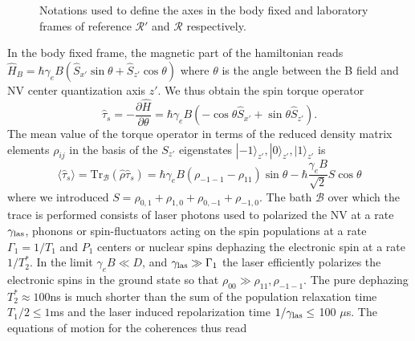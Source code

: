 \documentclass[preprintnumbers,amsmath,amssymb,onecolumn,12pt]{revtex4}
\newcommand{\be}{\begin{equation}}
\newcommand{\ee}{\end{equation}}
\begin{document}
\begin{figure}[ht]
  \caption{Notations used to define the axes in the body fixed and laboratory frames of reference $\mathcal{R'}$ and $\mathcal{R}$ respectively.}
  		\label{axes}
\end{figure}

In the body fixed frame, the magnetic part of the hamiltonian reads 
$\hat {H}_{B}= \hbar \gamma_e B  (\hat{S}_{x'} \sin\theta + \hat{S}_{z'} \cos\theta)$
where $\theta$ is the angle between the B field and NV center quantization axis $z'$.
We thus obtain the spin torque operator
\be
\hat \tau_s = -\frac{\partial \hat{H}}{\partial \theta} = \hbar \gamma_e B (-\cos\theta \hat{S}_{x'}+\sin\theta \hat{S}_{z'}).
\ee
The mean value of the torque operator in terms of the reduced density matrix elements $\rho_{ij}$ in the basis of the $S_{z'}$ eigenstates $|-1\rangle_{z'},|0\rangle_{z'},|1\rangle_{z'}$ is 
\be
\langle \hat \tau_s \rangle =\mathrm{Tr}_\mathcal{B}(\hat \rho \hat \tau_s) = \hbar \gamma_e B   (\rho_{-1-1}-\rho_{11})\sin\theta - \hbar \frac{\gamma_e B}{\sqrt{2}} S \cos\theta\label{torquemean}
\ee
where we introduced $S=\rho_{0,1}+\rho_{1,0}+\rho_{0,-1}+\rho_{-1,0}$.
The bath $\mathcal{B}$ over which the trace is performed consists of laser photons used to polarized the NV at a rate $\gamma_{\rm las}$, phonons or spin-fluctuators acting on the spin populations at a rate $\Gamma_1=1/T_1$ and 
$P_1$ centers or nuclear spins dephazing the electronic spin at a rate $1/T_2^*$.
In the limit $\gamma_e B \ll D$, and $\gamma_{\rm las}\gg \Gamma_1$ the laser efficiently polarizes the electronic spins in the ground state so that $\rho_{00}\gg {\rho_{11},\rho_{-1-1}}$.
The pure dephazing $T_2^*\approx 100$ns is much shorter than the sum of the population relaxation time $T_1/2 \le 1$ms and the laser induced repolarization time $1/\gamma_{\rm las} \le $ 100 $\mu$s. The equations of motion for the coherences thus read 
\end{document}
